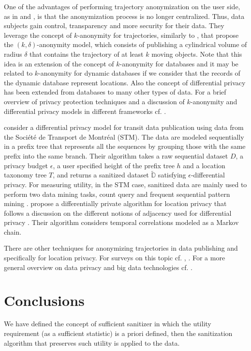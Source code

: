 \documentclass[times,twocolumn,final,authoryear]{elsarticle}
\begin{document}
One of the advantages of performing trajectory anonymization on the user side, as in \cite{Romero-Tris2016} and \cite{Romero-Tris:2018}, is that the anonymization process is no longer centralized. Thus, data subjects gain control, transparency and more security for their data.
They leverage the concept of $k$-anonymity for trajectories, similarly to \cite{Abul2008}, that propose the $(k, \delta)$-anonymity model, which consists of publishing a cylindrical volume of radius $\delta$ that contains the trajectory of at least $k$ moving objects. 
Note that this idea is an extension of the concept of $k$-anonymity for databases \citep{Samarati:1998} and it may be related to $k$-anonymity for dynamic databases \citep{Salas:2018-b} if we consider that the records of the dynamic database represent locations.  
Also the concept of differential privacy \citep{Dwork:2006} has been extended from databases to many other types of data.
For a brief overview of privacy protection techniques and a discussion of $k$-anonymity and differential privacy models in different frameworks cf. \cite{Salas:2018}.


\cite{Chen:2012} consider a differential privacy model for transit data publication using data from the Soci\'{e}t\'{e} de Transport de Montr\'{e}al (STM). 
The data are modeled sequentially in a prefix tree that represents all the sequences by grouping those with the same prefix into the same branch.
Their algorithm takes a raw sequential dataset $D$, a privacy budget $\epsilon$, a user specified height of the prefix tree $h$ and a location taxonomy tree $T$, and returns a sanitized dataset $\widetilde{\mathbb{D}}$ satisfying $\epsilon$-differential privacy.
For measuring utility, in the STM case, sanitized data are mainly used to perform two
data mining tasks, count query and frequent sequential pattern mining \citep{Agrawal:1995}.
\cite{Xiao:2015} propose a differentially private algorithm for location privacy that follows a discussion on the different notions of adjacency used for  differential privacy \cite{Chatzik:2013,Kifer:2011}.
Their algorithm considers temporal correlations modeled as a Markov chain.

There are other techniques for anonymizing trajectories in data publishing and specifically for
location privacy. For surveys on this topic cf. \cite{Fiore:2019}, \cite{Primault:2019}.
For a more general overview on data privacy and big data technologies cf. \cite{Torra:book}.  
\section{Conclusions}\label{Sec:conclusions}
We have defined the concept of sufficient sanitizer in which the utility requirement (as a sufficient statistic) is a priori defined, then the sanitization algorithm that preserves such utility is applied to the data.
\end{document}
